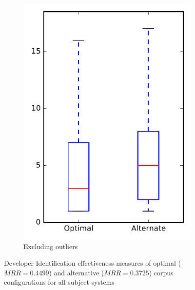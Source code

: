 \begin{figure}
\begin{subfigure}{.4\textwidth}
        \includegraphics[height=0.4\textheight]{figures/combo/dit_rq2_all_no_outlier}
        \caption{Excluding outliers}\label{fig:combo:dit:rq2:all_no_outlier}
    \end{subfigure}
\caption{Developer Identification effectiveness measures of optimal ($MRR=0.4499$) and alternative ($MRR=0.3725$) corpus configurations for all subject systems}
\label{fig:combo:dit:rq2:all}
\end{figure}
